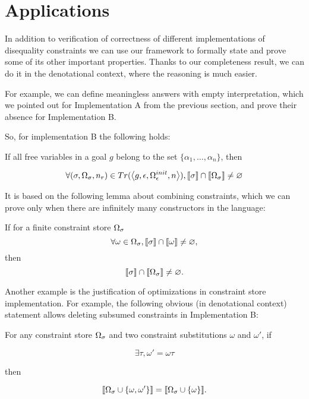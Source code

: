 \section{Applications}

In addition to verification of correctness of different implementations of disequality constraints we can use our framework to formally
state and prove some of its other important properties. Thanks to our completeness result, we can do it in the denotational context,
where the reasoning is much easier.

For example, we can define meaningless answers with empty interpretation, which we pointed out for Implementation A from the previous section,
and prove their absence for Implementation B.

So, for implementation B the following holds:

\begin{lemma}
If all free variables in a goal $g$ belong to the set $\{\alpha_1,\dots,\alpha_n\}$, then

\[ \forall (\sigma, \Omega_\sigma, n_r) \in Tr(\left<{g, \epsilon, \Omega_\epsilon^{init}, n}\right>), \llbracket{\sigma}\rrbracket \cap \llbracket{\Omega_\sigma}\rrbracket \neq \varnothing \]
\end{lemma}

It is based on the following lemma about combining constraints, which we can prove only when there are infinitely many constructors in the language:

\begin{lemma}
If for a finite constraint store $\Omega_\sigma$
\[ \forall \omega \in \Omega_\sigma,  \llbracket{\sigma}\rrbracket \cap \llbracket{\omega}\rrbracket \neq \varnothing, \]
then
\[ \llbracket{\sigma}\rrbracket \cap \llbracket{\Omega_\sigma}\rrbracket \neq \varnothing. \]
\end{lemma}

Another example is the justification of optimizations in constraint store implementation. For example, the following obvious (in denotational context) statement
allows deleting subsumed constraints in Implementation B:

\begin{lemma}
For any constraint store $\Omega_\sigma$ and two constraint substitutions $\omega$ and $\omega'$, if

\[ \exists \tau, \omega' = \omega \tau \]

then

\[ \llbracket{\Omega_\sigma \cup \{\omega, \omega'\}}\rrbracket = \llbracket{\Omega_\sigma \cup \{\omega\}}\rrbracket. \]
\end{lemma}
